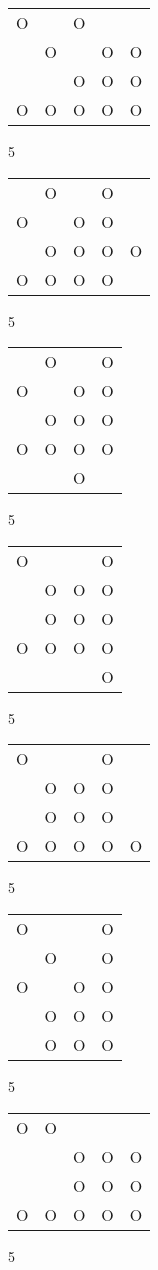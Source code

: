 \begin{tabular}{|m{0.2cm}m{0.2cm}m{0.2cm}m{0.2cm}m{0.2cm}|}\hline
O& &O& & \\
 &O& &O&O\\
 & &O&O&O\\
O&O&O&O&O\\
\hline\end{tabular}5
\begin{tabular}{|m{0.2cm}m{0.2cm}m{0.2cm}m{0.2cm}m{0.2cm}|}\hline
 &O& &O& \\
O& &O&O& \\
 &O&O&O&O\\
O&O&O&O& \\
\hline\end{tabular}5
\begin{tabular}{|m{0.2cm}m{0.2cm}m{0.2cm}m{0.2cm}|}\hline
 &O& &O\\
O& &O&O\\
 &O&O&O\\
O&O&O&O\\
 & &O& \\
\hline\end{tabular}5
\begin{tabular}{|m{0.2cm}m{0.2cm}m{0.2cm}m{0.2cm}|}\hline
O& & &O\\
 &O&O&O\\
 &O&O&O\\
O&O&O&O\\
 & & &O\\
\hline\end{tabular}5
\begin{tabular}{|m{0.2cm}m{0.2cm}m{0.2cm}m{0.2cm}m{0.2cm}|}\hline
O& & &O& \\
 &O&O&O& \\
 &O&O&O& \\
O&O&O&O&O\\
\hline\end{tabular}5
\begin{tabular}{|m{0.2cm}m{0.2cm}m{0.2cm}m{0.2cm}|}\hline
O& & &O\\
 &O& &O\\
O& &O&O\\
 &O&O&O\\
 &O&O&O\\
\hline\end{tabular}5
\begin{tabular}{|m{0.2cm}m{0.2cm}m{0.2cm}m{0.2cm}m{0.2cm}|}\hline
O&O& & & \\
 & &O&O&O\\
 & &O&O&O\\
O&O&O&O&O\\
\hline\end{tabular}5
